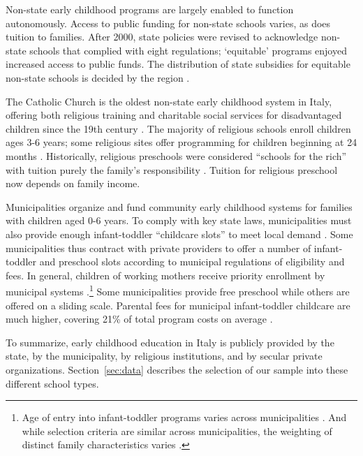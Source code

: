 Non-state early childhood programs are largely enabled to function autonomously. Access to public funding for non-state schools varies, as does tuition to families. After 2000, state policies were revised to acknowledge non-state schools that complied with eight regulations; `equitable' programs enjoyed increased access to public funds. The distribution of state subsidies for equitable non-state schools is decided by the region \citep{Hohnerlein_2009_Paradox-Public-Preschools,Ribolzi_2013_Italy}. 

The Catholic Church is the oldest non-state early childhood system in Italy, offering both religious training and charitable social services for disadvantaged children since the 19th century \citep{OECD_2001_Italy-Country-Note}. The majority of religious schools enroll children ages 3-6 years; some religious sites offer programming for children beginning at 24 months \citep{Malizia-Cicatelli_2011_BOOK_Catholic-School}. Historically, religious preschools were considered ``schools for the rich'' with tuition purely the family's responsibility \citep{Ribolzi_2013_Italy}. Tuition for religious preschool now depends on family income. 

Municipalities organize and fund community early childhood systems for families with children aged 0-6 years. To comply with key state laws, municipalities must also provide enough infant-toddler ``childcare slots'' to meet local demand \citep{Saraceno_1984_Soc-Probs}. Some municipalities thus contract with private providers to offer a number of infant-toddler and preschool slots according to municipal regulations of eligibility and fees. In general, children of working mothers receive priority enrollment by municipal systems \citep{Saraceno_1984_Soc-Probs}.\footnote{Age of entry into infant-toddler programs varies across municipalities \citep{CEHD_2016_Historical-Analysis}. And while selection criteria are similar across municipalities, the weighting of distinct family characteristics varies \citep{Del-Boca-etal_2016_CESifo-ES}.} Some municipalities provide free preschool while others are offered on a sliding scale. Parental fees for municipal infant-toddler childcare are much higher, covering 21\% of total program costs on average \citep{Musatti-Picchio_2010_IJEC}. 

To summarize, early childhood education in Italy is publicly provided by the state, by the municipality, by religious institutions, and by secular private organizations. Section~\ref{sec:data} describes the selection of our sample into these different school types. 

